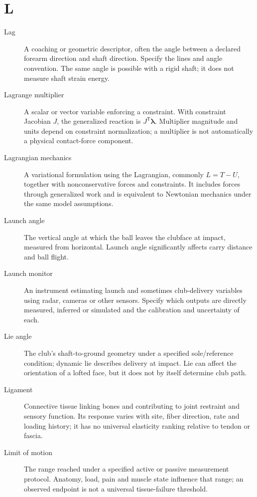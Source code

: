 \section*{L}
\begin{description}

\item[Lag] A coaching or geometric descriptor, often the angle between a declared forearm direction and shaft direction. Specify the lines and angle convention. The same angle is possible with a rigid shaft; it does not measure shaft strain energy.

\item[Lagrange multiplier] A scalar or vector variable enforcing a constraint. With constraint Jacobian $J$, the generalized reaction is $J^\mathsf{T}\boldsymbol{\lambda}$. Multiplier magnitude and units depend on constraint normalization; a multiplier is not automatically a physical contact-force component.

\item[Lagrangian mechanics] A variational formulation using the Lagrangian, commonly $L=T-U$, together with nonconservative forces and constraints. It includes forces through generalized work and is equivalent to Newtonian mechanics under the same model assumptions.

\item[Launch angle] The vertical angle at which the ball leaves the clubface at impact, measured from horizontal. Launch angle significantly affects carry distance and ball flight.

\item[Launch monitor] An instrument estimating launch and sometimes club-delivery variables using radar, cameras or other sensors. Specify which outputs are directly measured, inferred or simulated and the calibration and uncertainty of each.

\item[Lie angle] The club's shaft-to-ground geometry under a specified sole/reference condition; dynamic lie describes delivery at impact. Lie can affect the orientation of a lofted face, but it does not by itself determine club path.

\item[Ligament] Connective tissue linking bones and contributing to joint restraint and sensory function. Its response varies with site, fiber direction, rate and loading history; it has no universal elasticity ranking relative to tendon or fascia.

\item[Limit of motion] The range reached under a specified active or passive measurement protocol. Anatomy, load, pain and muscle state influence that range; an observed endpoint is not a universal tissue-failure threshold.


\end{description}
